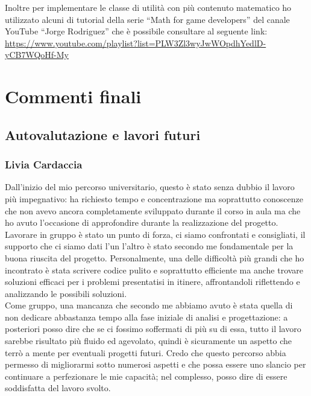 \documentclass{article}
\begin{document}
Inoltre per implementare le classe di utilità con più contenuto matematico ho utilizzato alcuni di tutorial della serie “Math for game developers” del canale YouTube “Jorge Rodriguez” che è possibile consultare al seguente link:
\url{https://www.youtube.com/playlist?list=PLW3Zl3wyJwWOpdhYedlD-yCB7WQoHf-My}

\large
\newpage
\section{Commenti finali}
\subsection{Autovalutazione e lavori futuri}
\subsubsection{Livia Cardaccia}
Dall'inizio del mio percorso universitario, questo è stato senza dubbio il lavoro più impegnativo: ha richiesto tempo e concentrazione ma soprattutto conoscenze che non avevo ancora completamente sviluppato durante il corso in aula ma che ho avuto l'occasione di approfondire durante la realizzazione del progetto. Lavorare in gruppo è stato un punto di forza, ci siamo confrontati e consigliati, il supporto che ci siamo dati l'un l'altro è stato secondo me fondamentale per la buona riuscita del progetto. Personalmente, una delle difficoltà più grandi che ho incontrato è stata scrivere codice pulito e soprattutto efficiente ma anche trovare soluzioni efficaci per i problemi presentatisi in itinere, affrontandoli riflettendo e analizzando le possibili soluzioni.\\
Come gruppo, una mancanza che secondo me abbiamo avuto è stata quella di non dedicare abbastanza tempo alla fase iniziale di analisi e progettazione: a posteriori posso dire che se ci fossimo soffermati di più su di essa, tutto il lavoro sarebbe risultato più fluido ed agevolato, quindi è sicuramente un aspetto che terrò a mente per eventuali progetti futuri.
Credo che questo percorso abbia permesso di migliorarmi sotto numerosi aspetti e che possa essere uno slancio per continuare a perfezionare le mie capacità; nel complesso, posso dire di essere soddisfatta del lavoro svolto.
\end{document}
